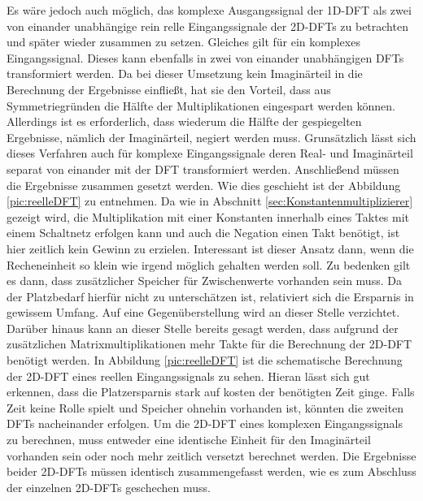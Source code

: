 Es wäre jedoch auch möglich, das komplexe Ausgangssignal der 1D-DFT als zwei von einander unabhängige rein relle Eingangssignale der 2D-DFTs zu betrachten und später 
wieder zusammen zu setzen. Gleiches gilt für ein komplexes Eingangssignal. Dieses kann ebenfalls in zwei von einander unabhängigen DFTs transformiert werden.
Da bei dieser Umsetzung kein Imaginärteil in die Berechnung der Ergebnisse einfließt, hat sie den Vorteil, dass aus Symmetriegründen die Hälfte der Multiplikationen 
eingespart werden können. Allerdings ist es erforderlich, dass wiederum die Hälfte der gespiegelten Ergebnisse, nämlich der Imaginärteil, negiert werden muss. 
Grunsätzlich lässt sich dieses Verfahren auch für komplexe Eingangssignale deren Real- und Imaginärteil separat von einander mit der DFT transformiert werden.
Anschließend müssen die Ergebnisse zusammen gesetzt werden. Wie dies geschieht ist der Abbildung \ref{pic:reelleDFT} zu entnehmen.
Da wie in Abschnitt \ref{sec:Konstantenmultiplizierer} gezeigt wird, die Multiplikation
mit einer Konstanten innerhalb eines Taktes mit einem Schaltnetz erfolgen kann und auch die Negation einen Takt benötigt, ist hier zeitlich kein Gewinn zu erzielen.
Interessant ist dieser Ansatz dann, wenn die Recheneinheit so klein wie irgend möglich gehalten werden soll. Zu bedenken gilt es dann, dass zusätzlicher Speicher für 
Zwischenwerte vorhanden sein muss. Da der Platzbedarf hierfür nicht zu unterschätzen ist, relativiert sich die Ersparnis in gewissem Umfang. Auf eine Gegenüberstellung
wird an dieser Stelle verzichtet.
Darüber hinaus kann an dieser Stelle bereits gesagt werden, dass aufgrund der zusätzlichen Matrixmultiplikationen mehr Takte für die Berechnung der 2D-DFT benötigt werden.
In Abbildung \ref{pic:reelleDFT} ist die schematische Berechnung der 2D-DFT eines reellen Eingangssignals zu sehen. Hieran lässt sich gut erkennen, dass die Platzersparnis
stark auf kosten der benötigten Zeit ginge. Falls Zeit keine Rolle spielt und Speicher ohnehin vorhanden ist, könnten die zweiten DFTs nacheinander erfolgen.
Um die 2D-DFT eines komplexen Eingangssignals zu berechnen, muss entweder eine identische Einheit für den Imaginärteil vorhanden sein oder noch mehr zeitlich versetzt 
berechnet werden. Die Ergebnisse beider 2D-DFTs müssen identisch zusammengefasst werden, wie es zum Abschluss der einzelnen 2D-DFTs geschechen muss.

